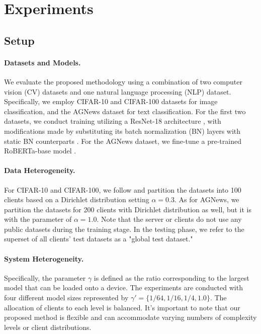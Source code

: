\documentclass{article}
\renewcommand{\cite}{\citep}
\theoremstyle{plain}
\theoremstyle{definition}
\theoremstyle{remark}
\begin{document}
\section{Experiments} \label{sec:experiments}


\subsection{Setup} \label{subsec:exp_setup}

\paragraph{Datasets and Models.} 
We evaluate the proposed methodology using a combination of two computer vision (CV) datasets and one natural language processing (NLP) dataset. Specifically, we employ CIFAR-10 and CIFAR-100 datasets \cite{krizhevsky2009learning} for image classification, and the AGNews dataset \cite{zhang2015character} for text classification. For the first two datasets, we conduct training utilizing a ResNet-18 architecture \cite{he2016deep}, with modifications made by substituting its batch normalization (BN) layers with static BN counterparts \cite{diao2020heterofl}. For the AGNews dataset, we fine-tune a pre-trained RoBERTa-base model \cite{liu2019roberta}. 

\paragraph{Data Heterogeneity.}  For CIFAR-10 and CIFAR-100, we follow \cite{hsu2019measuring, jhunjhunwala2022fedexp} and partition the datasets into 100 clients based on a Dirichlet distribution setting $\alpha = 0.3$. As for AGNews, we partition the datasets for 200 clients with Dirichlet distribution as well, but it is with the parameter of $\alpha=1.0$. Note that the server or clients do not use any public datasets during the training stage. In the testing phase, we refer to the superset of all clients' test datasets as a "global test dataset."

\paragraph{System Heterogeneity.} 
Specifically, the parameter $\gamma$ is defined as the ratio corresponding to the largest model that can be loaded onto a device. The experiments are conducted with four different model sizes represented by $\gamma' = \{1/64, 1/16, 1/4, 1.0\}$. The allocation of clients to each level is balanced. It's important to note that our proposed method is flexible and can accommodate varying numbers of complexity levels or client distributions.
\end{document}
